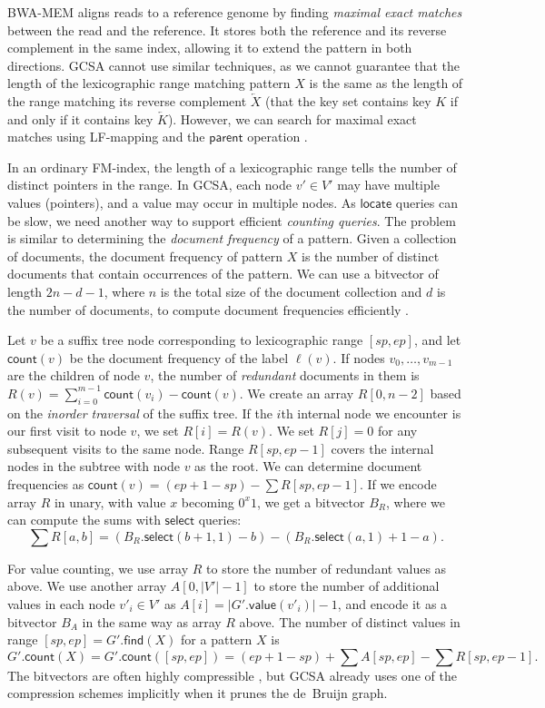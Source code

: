 \documentclass[a4paper,UKenglish]{lipics-v2016}
\newcommand{\abs}[1]{\ensuremath{\lvert #1 \rvert}}
\newcommand{\revcomp}[1]{\ensuremath{\overleftarrow{#1}}}
\newcommand{\select}{\ensuremath{\mathsf{select}}}
\newcommand{\find}{\ensuremath{\mathsf{find}}}
\newcommand{\locate}{\ensuremath{\mathsf{locate}}}
\newcommand{\parent}{\ensuremath{\mathsf{parent}}}
\newcommand{\countq}{\ensuremath{\mathsf{count}}}
\newcommand{\gvalue}{\ensuremath{\mathsf{value}}}
\newcommand{\LFmapping}{LF\nobreakdash-mapping}
\begin{document}
BWA-MEM \cite{Li2013} aligns reads to a reference genome by finding \emph{maximal exact matches} between the read and the reference. It stores both the reference and its reverse complement in the same index, allowing it to extend the pattern in both directions. GCSA cannot use similar techniques, as we cannot guarantee that the length of the lexicographic range matching pattern $X$ is the same as the length of the range matching its reverse complement $\revcomp{X}$ (that the key set contains key $K$ if and only if it contains key $\revcomp{K}$). However, we can search for maximal exact matches using \LFmapping{} and the $\parent$ operation \cite{Ohlebusch2010a}.

In an ordinary FM\nobreakdash-index, the length of a lexicographic range tells the number of distinct pointers in the range. In GCSA, each node $v' \in V'$ may have multiple values (pointers), and a value may occur in multiple nodes. As $\locate$ queries can be slow, we need another way to support efficient \emph{counting queries}. The problem is similar to determining the \emph{document frequency} of a pattern. Given a collection of documents, the document frequency of pattern $X$ is the number of distinct documents that contain occurrences of the pattern. We can use a bitvector of length $2n-d-1$, where $n$ is the total size of the document collection and $d$ is the number of documents, to compute document frequencies efficiently \cite{Sadakane2007a}.

Let $v$ be a suffix tree node corresponding to lexicographic range $[sp, ep]$, and let $\countq(v)$ be the document frequency of the label $\ell(v)$. If nodes $v_{0}, \dotsc, v_{m-1}$ are the children of node $v$, the number of \emph{redundant} documents in them is $R(v) = \sum_{i=0}^{m-1} \countq(v_{i}) - \countq(v)$. We create an array $R[0, n-2]$ based on the \emph{inorder traversal} of the suffix tree. If the $i$th internal node we encounter is our first visit to node $v$, we set $R[i] = R(v)$. We set $R[j] = 0$ for any subsequent visits to the same node. Range $R[sp, ep-1]$ covers the internal nodes in the subtree with node $v$ as the root. We can determine document frequencies as $\countq(v) = (ep+1-sp) - \sum R[sp, ep-1]$. If we encode array $R$ in unary, with value $x$ becoming $0^{x} 1$, we get a bitvector $B_{R}$, where we can compute the sums with $\select$ queries:
$$
\sum R[a, b] = (B_{R}.\select(b+1, 1) - b) - (B_{R}.\select(a, 1) + 1 - a).
$$

For value counting, we use array $R$ to store the number of redundant values as above. We use another array $A[0, \abs{V'}-1]$ to store the number of additional values in each node $v'_{i} \in V'$ as $A[i] = \abs{G'.\gvalue(v'_{i})}-1$, and encode it as a bitvector $B_{A}$ in the same way as array $R$ above. The number of distinct values in range $[sp,ep] = G'.\find(X)$ for a pattern $X$ is
$$
G'.\countq(X) = G'.\countq([sp, ep]) = (ep+1-sp) + \sum A[sp, ep] - \sum R[sp, ep-1].
$$
The bitvectors are often highly compressible \cite{Gagie2015}, but GCSA already uses one of the compression schemes implicitly when it prunes the de~Bruijn graph.
\end{document}

